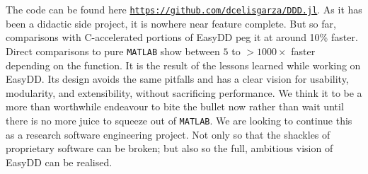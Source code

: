 The code can be found here \href{https://github.com/dcelisgarza/DDD.jl}{\texttt{https://github.com/dcelisgarza/DDD.jl}}. As it has been a didactic side project, it is nowhere near feature complete. But so far, comparisons with C-accelerated portions of EasyDD peg it at around 10\% faster. Direct comparisons to pure \texttt{MATLAB} show between $5$ to $>1000 \times$ faster depending on the function. It is the result of the lessons learned while working on EasyDD. Its design avoids the same pitfalls and has a clear vision for usability, modularity, and extensibility, without sacrificing performance. We think it to be a more than worthwhile endeavour to bite the bullet now rather than wait until there is no more juice to squeeze out of \texttt{MATLAB}. We are looking to continue this as a research software engineering project. Not only so that the shackles of proprietary software can be broken; but also so the full, ambitious vision of EasyDD can be realised.

